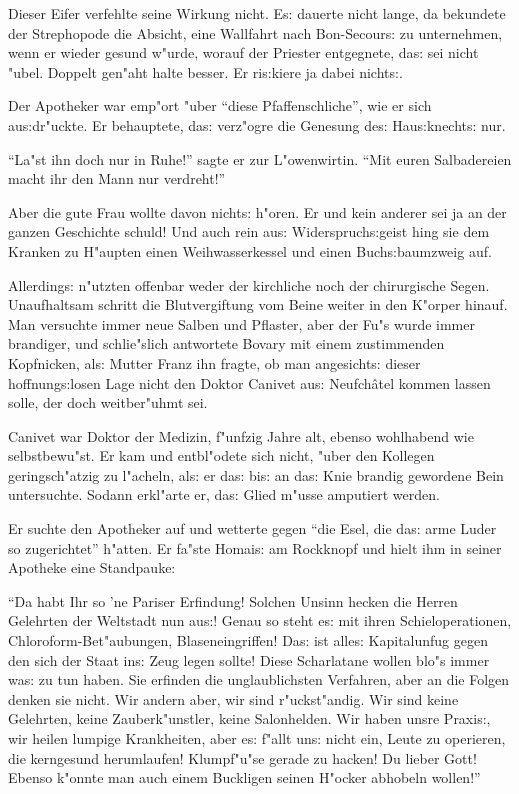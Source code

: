 \documentclass[oneside,12pt]{book}
\newcommand{\s}{s:}%
\begin{document}
Dieser Eifer verfehlte seine Wirkung nicht. E{\s} dauerte nicht
lange, da bekundete der Strephopode die Absicht, eine Wallfahrt
nach Bon-Secour{\s} zu unternehmen, wenn er wieder gesund w"urde,
worauf der Priester entgegnete, da{\s} sei nicht "ubel. Doppelt
gen"aht halte besser. Er ri{\s}kiere ja dabei nicht{\s}.

Der Apotheker war emp"ort "uber "`diese Pfaffenschliche"', wie er
sich au{\s}dr"uckte. Er behauptete, da{\s} verz"ogre die Genesung
de{\s} Hau{\s}knecht{\s} nur.

"`La"st ihn doch nur in Ruhe!"' sagte er zur L"owenwirtin. "`Mit
euren Salbadereien macht ihr den Mann nur verdreht!"'

Aber die gute Frau wollte davon nicht{\s} h"oren. Er und kein
anderer sei ja an der ganzen Geschichte schuld! Und auch rein
au{\s} Widerspruch{\s}geist hing sie dem Kranken zu H"aupten einen
Weihwasserkessel und einen Buch{\s}baumzweig auf.

Allerding{\s} n"utzten offenbar weder der kirchliche noch der
chirurgische Segen. Unaufhaltsam schritt die Blutvergiftung vom
Beine weiter in den K"orper hinauf. Man versuchte immer neue
Salben und Pflaster, aber der Fu"s wurde immer brandiger, und
schlie"slich antwortete Bovary mit einem zustimmenden Kopfnicken,
al{\s} Mutter Franz ihn fragte, ob man angesicht{\s} dieser
hoffnung{\s}losen Lage nicht den Doktor Canivet au{\s}
Neufch\^atel kommen lassen solle, der doch weitber"uhmt sei.

Canivet war Doktor der Medizin, f"unfzig Jahre alt, ebenso
wohlhabend wie selbstbewu"st. Er kam und entbl"odete sich nicht,
"uber den Kollegen geringsch"atzig zu l"acheln, al{\s} er da{\s}
bi{\s} an da{\s} Knie brandig gewordene Bein untersuchte. Sodann
erkl"arte er, da{\s} Glied m"usse amputiert werden.

Er suchte den Apotheker auf und wetterte gegen "`die Esel, die
da{\s} arme Luder so zugerichtet"' h"atten. Er fa"ste Homai{\s} am
Rockknopf und hielt ihm in seiner Apotheke eine Standpauke:

"`Da habt Ihr so 'ne Pariser Erfindung! Solchen Unsinn hecken die
Herren Gelehrten der Weltstadt nun au{\s}! Genau so steht e{\s}
mit ihren Schieloperationen, Chloroform-Bet"aubungen,
Blaseneingriffen! Da{\s} ist alle{\s} Kapitalunfug gegen den sich
der Staat in{\s} Zeug legen sollte! Diese Scharlatane wollen blo"s
immer wa{\s} zu tun haben. Sie erfinden die unglaublichsten
Verfahren, aber an die Folgen denken sie nicht. Wir andern aber,
wir sind r"uckst"andig. Wir sind keine Gelehrten, keine
Zauberk"unstler, keine Salonhelden. Wir haben unsre Praxi{\s}, wir
heilen lumpige Krankheiten, aber e{\s} f"allt un{\s} nicht ein,
Leute zu operieren, die kerngesund herumlaufen! Klumpf"u"se gerade
zu hacken! Du lieber Gott! Ebenso k"onnte man auch einem Buckligen
seinen H"ocker abhobeln wollen!"'
\end{document}
